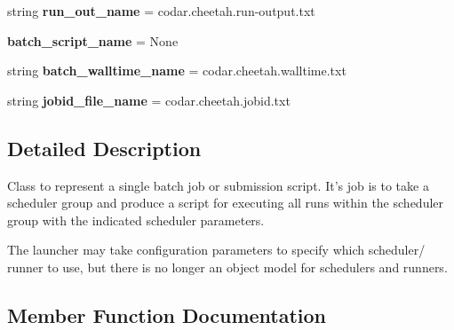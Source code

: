 \begin{DoxyCompactItemize}
\item 
\mbox{\label{classcodar_1_1cheetah_1_1launchers_1_1_launcher_a177b178c57aa1f5862b5ce57a7f357d6}} 
string {\bfseries run\+\_\+out\+\_\+name} = \textquotesingle{}codar.\+cheetah.\+run-\/output.\+txt\textquotesingle{}
\item 
\mbox{\label{classcodar_1_1cheetah_1_1launchers_1_1_launcher_af55f3a888f545826d771f3679152da47}} 
{\bfseries batch\+\_\+script\+\_\+name} = None
\item 
\mbox{\label{classcodar_1_1cheetah_1_1launchers_1_1_launcher_abfcb19cb3d329c4ea0f362667f70df2f}} 
string {\bfseries batch\+\_\+walltime\+\_\+name} = \textquotesingle{}codar.\+cheetah.\+walltime.\+txt\textquotesingle{}
\item 
\mbox{\label{classcodar_1_1cheetah_1_1launchers_1_1_launcher_a25b770312bca1ca9b0deefa1faf89c06}} 
string {\bfseries jobid\+\_\+file\+\_\+name} = \textquotesingle{}codar.\+cheetah.\+jobid.\+txt\textquotesingle{}
\end{DoxyCompactItemize}


\subsection{Detailed Description}
\begin{DoxyVerb}Class to represent a single batch job or submission script.
It's job is to take a scheduler group and produce a script for executing
all runs within the scheduler group with the indicated scheduler
parameters.

The launcher may take configuration parameters to specify which scheduler/
runner to use, but there is no longer an object model for schedulers and
runners.
\end{DoxyVerb}
 

\subsection{Member Function Documentation}
\mbox{\label{classcodar_1_1cheetah_1_1launchers_1_1_launcher_a96798b79cb86f858f30dfdff1618bfb3}} 
